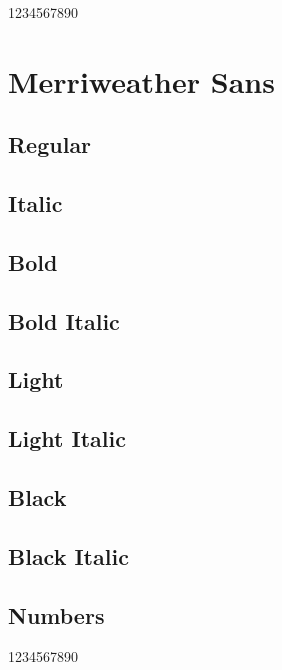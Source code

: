 \documentclass{article}
\begin{document}
1234567890


\section{Merriweather Sans}\sf

\subsection*{Regular}
\lipsum[1]

\subsection*{Italic}
\textit{\lipsum[2]}

\subsection*{Bold}
\textbf{\lipsum[3]}

\subsection*{Bold Italic}

\textbf{\textit{\lipsum[4]}}

\subsection*{Light}

{\merriweathersanslight\lipsum[5]}

\subsection*{Light Italic}

\textit{\merriweathersanslight\lipsum[6]}

\subsection*{Black}

{\merriweathersansblack\lipsum[7]}

\subsection*{Black Italic}

\textit{\merriweathersansblack\lipsum[8]}


\subsection*{Numbers}

1234567890
\end{document}
